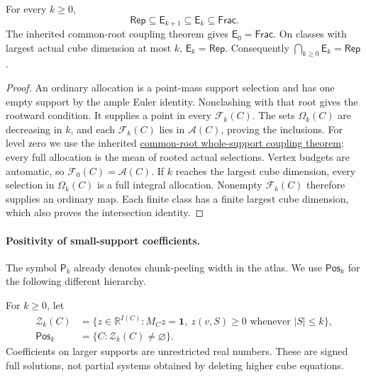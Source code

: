 \begin{proposition}
\label{prop:refinement-coupling-chain}
For every $k\ge0$,
\[
 \mathsf{Rep}\subseteq\mathsf E_{k+1}\subseteq\mathsf E_k
 \subseteq\mathsf{Frac}.
\]
The inherited common-root coupling theorem gives $\mathsf E_0=\mathsf{Frac}$.
On classes with largest actual cube dimension at most $k$,
$\mathsf E_k=\mathsf{Rep}$. Consequently
$\bigcap_{k\ge0}\mathsf E_k=\mathsf{Rep}$.
\end{proposition}
\begin{proof}
An ordinary allocation is a point-mass support selection and has one empty
support by the ample Euler identity. Nonclashing with that root gives the
rootward condition. It supplies a point in every $\mathcal F_k(C)$.
The sets $\Omega_k(C)$ are decreasing in $k$, and each $\mathcal F_k(C)$
lies in $\mathcal A(C)$, proving the inclusions.
For level zero we use the inherited
\href{../containment-rep-frac/sections/rooted_tree_transport.tex}{common-root whole-support coupling theorem}:
every full allocation is the mean of rooted actual selections. Vertex
budgets are automatic, so $\mathcal F_0(C)=\mathcal A(C)$.
If $k$ reaches the largest cube dimension, every selection in $\Omega_k(C)$
is a full integral allocation. Nonempty $\mathcal F_k(C)$ therefore supplies
an ordinary map. Each finite class has a finite largest cube dimension,
which also proves the intersection identity.
\end{proof}

\paragraph{Positivity of small-support coefficients.}
The symbol $\mathsf P_k$ already denotes chunk-peeling width in the atlas.
We use $\mathsf{Pos}_k$ for the following different hierarchy.

\begin{definition}
\label{def:refinement-positivity}
For $k\ge0$, let
\[
 \begin{aligned}
 \mathcal Z_k(C)&=\{z\in\mathbb R^{I(C)}:M_Cz=\mathbf1,
                   \ z(v,S)\ge0\text{ whenever }|S|\le k\},\\
 \mathsf{Pos}_k&=\{C:\mathcal Z_k(C)\ne\varnothing\}.
 \end{aligned}
\]
Coefficients on larger supports are unrestricted real numbers.
These are signed full solutions, not partial systems obtained by deleting
higher cube equations.
\end{definition}


